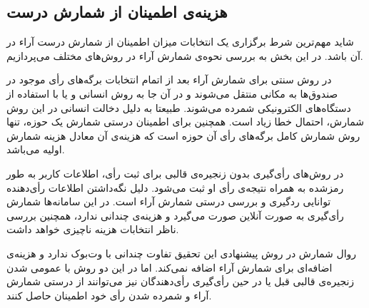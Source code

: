 \subsection{هزینه‌ی اطمینان از شمارش درست}
شاید مهم‌ترین شرط برگزاری یک انتخابات میزان اطمینان از شمارش درست آراء در آن‌ باشد. در این بخش به بررسی نحوه‌ی شمارش آراء در روش‌های مختلف می‌پردازیم. 
\par
در روش سنتی برای شمارش آراء بعد از اتمام انتخابات برگه‌های رأی‌ موجود در صندوق‌ها به مکانی منتقل می‌شوند و در آن‌ جا به روش انسانی و یا با استفاده از دستگاه‌های الکترونیکی شمرده می‌شوند. طبیعتا به دلیل دخالت انسانی در این روش شمارش، احتمال خطا زیاد است. همچنین برای اطمینان درستی شمارش یک حوزه، تنها روش شمارش کامل برگه‌های رأی‌ آن حوزه است که هزینه‌ی آن معادل هزینه شمارش اولیه می‌باشد. 
\par 
در روش‌های رأی‌گیری بدون زنجیره‌ی قالبی برای ثبت رأی، اطلاعات کاربر به طور رمزشده به همراه نتیجه‌ی رأی‌ او ثبت می‌شود. دلیل نگه‌داشتن اطلاعات رأی‌دهنده توانایی رد‌گیری و بررسی درستی شمارش آراء است. در این سامانه‌ها شمارش رأی‌گیری به صورت آنلاین صورت می‌گیرد و هزینه‌ی چندانی ندارد، همچنین بررسی ناظر انتخابات هزینه‌ ناچیزی خواهد داشت. 
\par 
روال شمارش در روش پیشنهادی این تحقیق تفاوت چندانی با وت‌بوک ندارد و هزینه‌ی اضافه‌ای برای شمارش آراء اضافه نمی‌کند. اما در این دو روش با عمومی شدن زنجیره‌ی قالبی قبل یا در حین رأی‌گیری رأی‌دهندگان نیز می‌توانند از درستی شمارش آراء و شمرده شدن رأی خود اطمینان حاصل کنند. 
